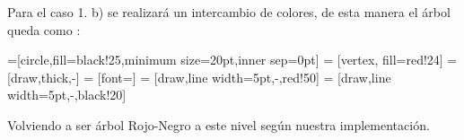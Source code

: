 \documentclass[dcc,sol]{fcfmcourse}
\begin{document}
Para el caso 1. b) se realizará un intercambio de colores, de esta manera el árbol queda como :
\begin{center}


=[circle,fill=black!25,minimum size=20pt,inner sep=0pt]
 = [vertex, fill=red!24]
 = [draw,thick,-]
 = [font=\small]
 = [draw,line width=5pt,-,red!50]
 = [draw,line width=5pt,-,black!20]


\end{center}
Volviendo a ser árbol Rojo-Negro a este nivel según nuestra implementación.\\
\end{document}
